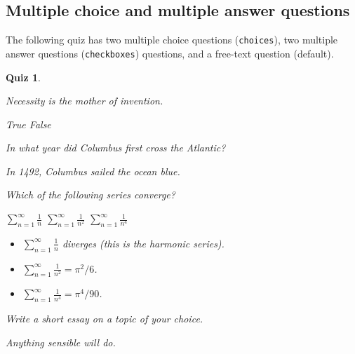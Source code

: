 \documentclass{article}
\theoremstyle{break}
\newcounter{theorem}
\newtheorem{quiz}[theorem]{Quiz}
\begin{document}
\subsection{Multiple choice and multiple answer questions}

The following quiz has two multiple choice questions (\texttt{choices}), two multiple answer questions (\texttt{checkboxes}) questions, and a free-text question (default).

\begin{quiz}
\begin{questions} 

\question Necessity is the mother of invention.
\begin{choices}
\correctchoice True 		
\choice False		
\end{choices}

\question In what year did Columbus first cross the Atlantic?
\begin{choices}
\end{choices}
\begin{answer}
In 1492, Columbus sailed the ocean blue.
\end{answer}

\question
\label{qu:series}
Which of the following series converge?
\begin{checkboxes}
\choice $\sum_{n=1}^{\infty}\frac{1}{n}$
\correctchoice $\sum_{n=1}^{\infty}\frac{1}{n^2}$
\correctchoice $\sum_{n=1}^{\infty}\frac{1}{n^4}$
\end{checkboxes}
\begin{answer}
\begin{itemize}
\item $\sum_{n=1}^{\infty}\frac{1}{n}$ diverges (this is the harmonic series). 
\item $\sum_{n=1}^{\infty}\frac{1}{n^2} = \pi^2/6$.
\item $\sum_{n=1}^{\infty}\frac{1}{n^4} = \pi^4/90$.
\end{itemize}
\end{answer}

\question 
Write a short essay on a topic of your choice.  
\begin{answer}
Anything sensible will do.
\end{answer}

\end{questions}
\end{quiz}
\end{document}
